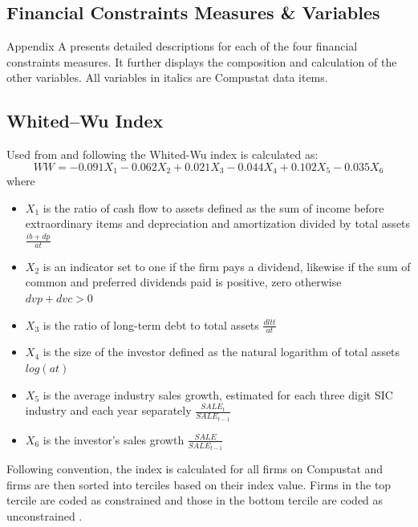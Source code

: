 \documentclass[12pt]{article}
\newcounter{savepage}
\begin{document}
\pagebreak
\cleardoublepage
{}
\setcounter{page}{\thesavepage}
\begin{appendices}
\renewcommand{\appendixname}{Appendix}

	\section{Financial Constraints Measures \& Variables}
Appendix A presents detailed descriptions for each of the four financial constraints measures. It further displays the composition and calculation of the other variables. All variables in italics are Compustat data items. 
	\subsection*{Whited--Wu Index}
	\noindent Used from \citet[p.543]{Whited2006} and following \citet[p.38]{Farre-mensa2013} the Whited-Wu index is calculated as:
		\begin{equation*}
		WW=-0.091X_{1}-0.062X_{2}+0.021X_{3}-0.044X_{4}+0.102X_{5}-0.035X_{6}
		\end{equation*}
	where
	\begin{itemize}
	\renewcommand\labelitemi{}
		\item $X_{1}$ is the ratio of cash flow to assets defined as the sum of income before extraordinary items and depreciation and amortization divided by total assets $\frac{ib+dp}{at}$
		\item $X_{2}$ is an indicator set to one if the firm pays a dividend, likewise if the sum of common and preferred dividends paid is positive, zero otherwise $dvp+dvc>0$
		\item $X_{3}$ is the ratio of long-term debt to total assets $\frac{dltt}{at}$
		\item $X_{4}$ is the size of the investor defined as the natural logarithm of total assets $log(at)$
		\item $X_{5}$ is the average industry sales growth, estimated for each three digit SIC industry and each year separately $\frac{SALE_{t}}{SALE_{t-1}}$
		\item $X_{6}$ is the investor's sales growth $\frac{SALE}{SALE_{t-1}}$
	\end{itemize}

	\noindent Following convention, the index is calculated for all firms on Compustat and firms are then sorted into terciles based on their index value. Firms in the top tercile are coded as constrained and those in the bottom tercile are coded as unconstrained \citep[p.38]{Farre-mensa2013}. 


\end{appendices}
\end{document}
